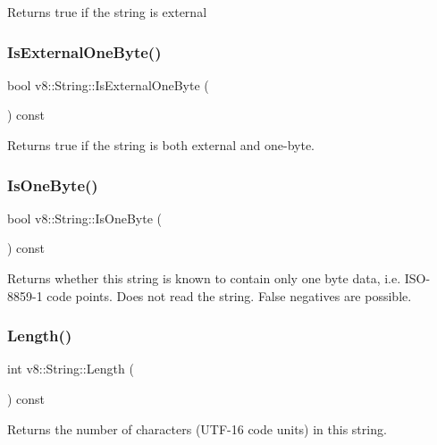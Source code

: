 Returns true if the string is external \mbox{\label{classv8_1_1String_a29b5d1786d906b84e10a5cab9451f976}} 
\subsubsection{\texorpdfstring{Is\+External\+One\+Byte()}{IsExternalOneByte()}}
{\footnotesize\ttfamily bool v8\+::\+String\+::\+Is\+External\+One\+Byte (\begin{DoxyParamCaption}{ }\end{DoxyParamCaption}) const}

Returns true if the string is both external and one-\/byte. \mbox{\label{classv8_1_1String_a8f14ab3aff52295d2d3245081a1b29eb}} 
\subsubsection{\texorpdfstring{Is\+One\+Byte()}{IsOneByte()}}
{\footnotesize\ttfamily bool v8\+::\+String\+::\+Is\+One\+Byte (\begin{DoxyParamCaption}{ }\end{DoxyParamCaption}) const}

Returns whether this string is known to contain only one byte data, i.\+e. I\+S\+O-\/8859-\/1 code points. Does not read the string. False negatives are possible. \mbox{\label{classv8_1_1String_afaa18eae27056bb7058f09920a238f53}} 
\subsubsection{\texorpdfstring{Length()}{Length()}}
{\footnotesize\ttfamily int v8\+::\+String\+::\+Length (\begin{DoxyParamCaption}{ }\end{DoxyParamCaption}) const}

Returns the number of characters (U\+T\+F-\/16 code units) in this string. \mbox{\label{classv8_1_1String_a5efd1eba40c1fa8a6aae2c4a175a63be}} 
